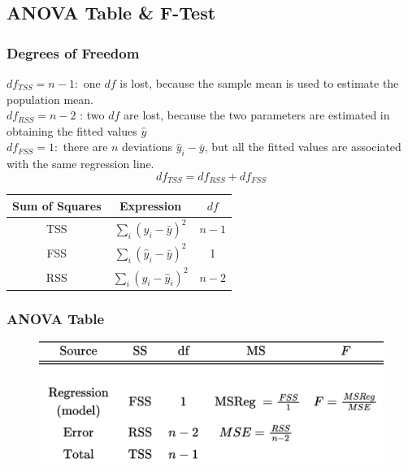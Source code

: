 \documentclass[11pt,a4paper]{article}
\begin{document}
\subsection{ANOVA Table \& F-Test}
\subsubsection{Degrees of Freedom}
$d f_{T S S}=n-1:$ one $d f$ is lost, because the sample mean is used to estimate the population mean.\\
$d f_{R S S}=n-2$ : two $d f$ are lost, because the two parameters are estimated in obtaining the fitted values $\hat{y}$\\
$d f_{F S S}=1:$ there are $n$ deviations $\hat{y}_{i}-\bar{y}$, but all the fitted values are associated with the same regression line.
$$d f_{T S S}=d f_{R S S}+d f_{F S S}$$
\begin{center}
\begin{tabular}{ccc}
\hline Sum of Squares & Expression & $d f$ \\
\hline \hline TSS & $\sum_{i}\left(y_{i}-\bar{y}\right)^{2}$ & $n-1$ \\
FSS & $\sum_{i}\left(\hat{y}_{i}-\bar{y}\right)^{2}$ & 1 \\
RSS & $\sum_{i}\left(y_{i}-\hat{y}_{i}\right)^{2}$ & $n-2$ \\
\hline
\end{tabular}
\end{center}

\subsubsection{ANOVA Table}

\begin{center}\begin{figure}[htbp]
    \centering
    \includegraphics[scale=1]{rendered_image.png}
    \caption{}
    \label{}
\end{figure}\end{center}
\end{document}
